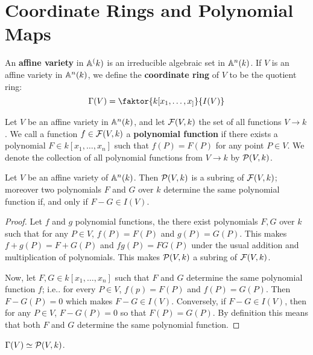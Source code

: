 \section{Coordinate Rings and Polynomial Maps}

\begin{definition}
  An \textbf{affine variety} in $\mathbb{A}^(k)$ is an irreducible algebraic set in
  $\mathbb{A}^n(k)$. If $V$ is an affine variety in  $\mathbb{A}^n(k)$, we define the
  \textbf{coordinate ring} of $V$ to be the quotient ring:
  \begin{equation*}
    \Gamma(V)=\faktor{k[x_1, \dots, x_]}{I(V)}
  \end{equation*}
\end{definition}

\begin{definition}
  Let $V$ be an affine variety in  $\mathbb{A}^n(k)$, and let $\mathcal{F}(V,k)$ the set of all
  functions $V \xrightarrow{} k$. We call a function $f \in \mathcal{F}(V,k)$ a
  \textbf{polynomial function} if there exists a polynomial $F \in k[x_1, \dots,
  x_n]$ such that $f(P)=F(P)$ for any point $P \in V$. We denote the collection
  of all polynomial functions from $V \xrightarrow{} k$ by $\mathcal{P}(V,k)$.
\end{definition}

\begin{theorem}\label{theorem_2.1.1}
  Let $V$ be an affine variety of  $\mathbb{A}^n(k)$. Then $\mathcal{P}(V,k)$ is a subring of
  $\mathcal{F}(V,k)$; moreover two polynomials $F$ and $G$ over $k$ determine the same
  polynomial function if, and only if $F-G \in I(V)$.
\end{theorem}
\begin{proof}
  Let $f$ and  $g$ polynomial functions, the there exist polynomials $F,G$ over $k$
  such that for any  $P \in V$, $f(P)=F(P)$ and $g(P)=G(P)$. This makes
  $f+g(P)=F+G(P)$ and $fg(P)=FG(P)$ under the usual addition and multiplication
  of polynomials. This makes $\mathcal{P}(V,k)$ a subring of $\mathcal{F}(V,k)$.

  Now, let $F,G \in k[x_1, \dots, x_n]$ such that $F$ and  $G$ determine the
  same polynomial function  $f$; i.e.. for every $P \in V$, $f(p)=F(P)$ and
  $f(P)=G(P)$. Then $F-G(P)=0$ which makes $F-G \in I(V)$. Conversely, if $F-G
  \in I(V)$, then for any $P \in V$, $F-G(P)=0$ so that $F(P)=G(P)$. By
  definition this means that both $F$ and  $G$ determine the same polynomial
  function.
\end{proof}
\begin{corollary}
  $\Gamma(V) \simeq \mathcal{P}(V,k)$.
\end{corollary}

